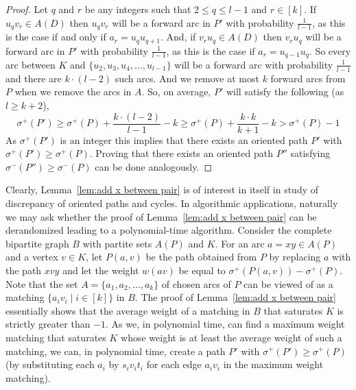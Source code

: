 \documentclass[11pt]{article}
\newcommand{\GGr}[1]{{#1}}
\newcommand{\2}{\vspace{0.2cm}}
\begin{document}
\begin{proof}
{          Let $q$ and $r$ be any integers such that $2 \leq q \leq l-1$ and $r \in [k]$.
          If  $u_q v_r \in A(D)$ then $u_qv_r$ will be a forward arc in $P'$ with probability $\frac{1}{l-1}$, as this is the case if and only if $a_r = u_q u_{q+1}$.
        And, if  $v_r u_q \in A(D)$ then $v_r u_q$ will be a forward arc in $P'$ with probability $\frac{1}{l-1}$, as
         this is the case if $a_r = u_{q-1} u_{q}$. So every arc between $K$ and $\{u_2,u_3,u_4, \ldots , u_{l-1}\}$ will be a forward arc
        with probability $\frac{1}{l-1}$ and there are $k \cdot (l-2)$ such arcs.  And we remove at most $k$ forward arcs from $P$ when we remove the arcs in $A$. So, on average, $P'$
        will satisfy the following (as $l \geq k+2$),
         \[
        \sigma^+(P') \geq \sigma^+(P) + \frac{k\cdot (l-2)}{l-1} - k \geq \sigma^+(P) + \frac{k\cdot k}{k+1} - k >  \sigma^+(P) -1
        \]
        As $\sigma^+(P')$ is an integer this implies that there exists an oriented path $P'$ with $\sigma^+(P') \geq \sigma^+(P)$.
        Proving that there exists an oriented path $P''$ satisfying $\sigma^-(P'') \ge \sigma^-(P)$ can be done analogously.}
	\end{proof}

\GGr{Clearly, Lemma~\ref{lem:add x between pair} is of interest in itself in study of discrepancy of oriented paths and cycles. In algorithmic applications, naturally we may ask whether 
the proof of Lemma~\ref{lem:add x between pair} can be derandomized leading to a polynomial-time algorithm. Consider the complete bipartite graph $B$ with partite sets $A(P)$ and $K$. For an arc $a=xy\in A(P)$ and a vertex $v\in K$, let $P(a,v)$ be the path obtained from $P$ by replacing $a$ with the path $xvy$ and let the weight $w(av)$ be equal to $\sigma^+(P(a,v))-\sigma^+(P)$. %
Note that the set $A=\{a_1,a_2,\ldots,a_k\}$ of chosen arcs of $P$ can be viewed of as a matching $\{a_i v_i \; | \; i \in [k] \}$ in $B$. }
\GGr{The proof of Lemma~\ref{lem:add x between pair} essentially shows that the average weight of a matching in $B$ that saturates $K$ is strictly greater than $-1$.
As we, in polynomial time, can find a maximum weight matching that saturates $K$ whose weight is at least the average weight of such a matching,
we can, in polynomial time, create a path $P'$ with $\sigma^+(P') \geq \sigma^+(P)$ (by substituting each $a_i$ by $s_i v_i t_i$ for each edge $a_i v_i$ in the maximum weight matching).
}
\end{document}
